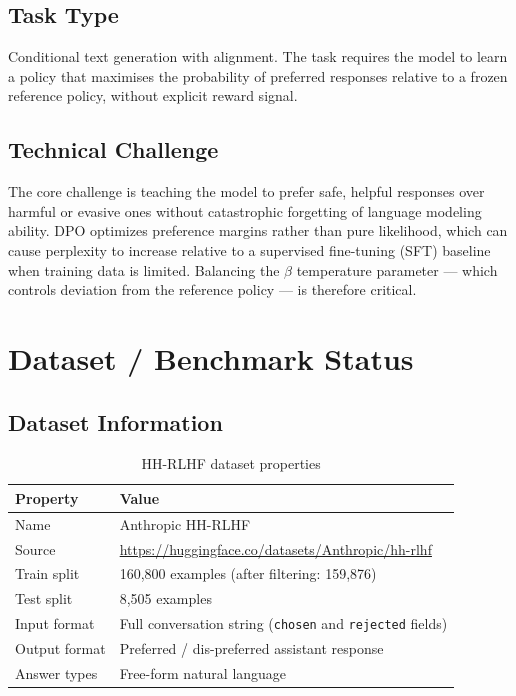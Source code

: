 \documentclass[12pt,a4paper]{article}
\begin{document}
\subsection*{Task Type}

Conditional text generation with alignment. The task requires the model to learn a
policy that maximises the probability of preferred responses relative to a frozen
reference policy, without explicit reward signal.

\subsection*{Technical Challenge}

The core challenge is teaching the model to prefer safe, helpful responses over
harmful or evasive ones without catastrophic forgetting of language modeling ability.
DPO optimizes preference margins rather than pure likelihood, which can cause
perplexity to increase relative to a supervised fine-tuning (SFT) baseline when
training data is limited. Balancing the $\beta$ temperature parameter --- which
controls deviation from the reference policy --- is therefore critical.

\section{Dataset / Benchmark Status}

\subsection*{Dataset Information}

\begin{table}[h]
\centering
\begin{tabular}{ll}
\toprule
\textbf{Property} & \textbf{Value} \\
\midrule
Name              & Anthropic HH-RLHF \cite{bai2022} \\
Source            & \url{https://huggingface.co/datasets/Anthropic/hh-rlhf} \\
Train split       & 160,800 examples (after filtering: 159,876) \\
Test split        & 8,505 examples \\
Input format      & Full conversation string (\texttt{chosen} and \texttt{rejected} fields) \\
Output format     & Preferred / dis-preferred assistant response \\
Answer types      & Free-form natural language \\
\bottomrule
\end{tabular}
\caption{HH-RLHF dataset properties}
\end{table}
\end{document}
